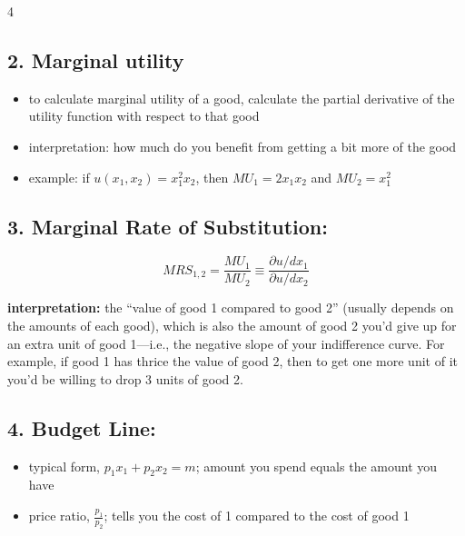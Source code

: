 \documentclass[8pt,landscape]{extarticle}
\begin{document}
\begin{multicols}{4}
\subsection*{2. Marginal utility}
\begin{itemize}[leftmargin=*,noitemsep,topsep=0pt]
\item to calculate marginal utility of a good, calculate the partial derivative of the utility function with respect to that good
\item interpretation: how much do you benefit from getting a bit more of the good
\item example: if $u(x_1,x_2) = x_1^2 x_2$, then $MU_1 = 2x_1 x_2$ and $MU_2 = x_1^2$
\end{itemize}

\subsection*{3. Marginal Rate of Substitution:}
$$MRS_{1,2} = \frac{MU_1}{MU_2} \equiv \frac{\partial u/dx_1}{\partial u/dx_2}$$

\textbf{interpretation:} the ``value of good 1 compared to good 2'' (usually depends on the amounts of each good), which is also the amount of good 2 you'd give up for an extra unit of good 1---i.e., the negative slope of your indifference curve. For example, if good 1 has thrice the value of good 2, then to get one more unit of it you'd be willing to drop 3 units of good 2.

\subsection*{4. Budget Line:}
\begin{itemize}[leftmargin=*,noitemsep,topsep=0pt]
\item typical form, $p_1 x_1 + p_2 x_2 = m$; amount you spend equals the amount you have
\item price ratio, $\frac{p_1}{p_2}$; tells you the cost of 1 compared to the cost of good 1
\end{itemize}


\end{multicols}
\end{document}
